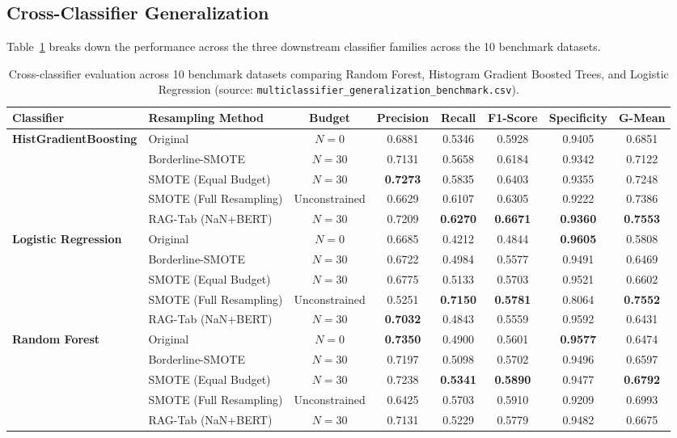 \documentclass[sn-basic]{sn-jnl}
\begin{document}
\subsection{Cross-Classifier Generalization}
\label{subsec:cross_classifier}

Table~\ref{tab:cross_classifier} breaks down the performance across the three downstream classifier families across the 10 benchmark datasets.

\begin{table}[t]
\centering
\caption{Cross-classifier evaluation across 10 benchmark datasets comparing Random Forest, Histogram Gradient Boosted Trees, and Logistic Regression (source: \texttt{multiclassifier\_generalization\_benchmark.csv}).}
\label{tab:cross_classifier}
\begin{tabular}{llcccccc}
\toprule
\textbf{Classifier} & \textbf{Resampling Method} & \textbf{Budget} & \textbf{Precision} & \textbf{Recall} & \textbf{F1-Score} & \textbf{Specificity} & \textbf{G-Mean} \\
\midrule
\multirow{5}{*}{\textbf{HistGradientBoosting}} & Original & $N=0$ & 0.6881 & 0.5346 & 0.5928 & 0.9405 & 0.6851 \\
& Borderline-SMOTE & $N=30$ & 0.7131 & 0.5658 & 0.6184 & 0.9342 & 0.7122 \\
& SMOTE (Equal Budget) & $N=30$ & \textbf{0.7273} & 0.5835 & 0.6403 & 0.9355 & 0.7248 \\
& SMOTE (Full Resampling) & Unconstrained & 0.6629 & 0.6107 & 0.6305 & 0.9222 & 0.7386 \\
& RAG-Tab (NaN+BERT) & $N=30$ & 0.7209 & \textbf{0.6270} & \textbf{0.6671} & \textbf{0.9360} & \textbf{0.7553} \\
\midrule
\multirow{5}{*}{\textbf{Logistic Regression}} & Original & $N=0$ & 0.6685 & 0.4212 & 0.4844 & \textbf{0.9605} & 0.5808 \\
& Borderline-SMOTE & $N=30$ & 0.6722 & 0.4984 & 0.5577 & 0.9491 & 0.6469 \\
& SMOTE (Equal Budget) & $N=30$ & 0.6775 & 0.5133 & 0.5703 & 0.9521 & 0.6602 \\
& SMOTE (Full Resampling) & Unconstrained & 0.5251 & \textbf{0.7150} & \textbf{0.5781} & 0.8064 & \textbf{0.7552} \\
& RAG-Tab (NaN+BERT) & $N=30$ & \textbf{0.7032} & 0.4843 & 0.5559 & 0.9592 & 0.6431 \\
\midrule
\multirow{5}{*}{\textbf{Random Forest}} & Original & $N=0$ & \textbf{0.7350} & 0.4900 & 0.5601 & \textbf{0.9577} & 0.6474 \\
& Borderline-SMOTE & $N=30$ & 0.7197 & 0.5098 & 0.5702 & 0.9496 & 0.6597 \\
& SMOTE (Equal Budget) & $N=30$ & 0.7238 & \textbf{0.5341} & \textbf{0.5890} & 0.9477 & \textbf{0.6792} \\
& SMOTE (Full Resampling) & Unconstrained & 0.6425 & 0.5703 & 0.5910 & 0.9209 & 0.6993 \\
& RAG-Tab (NaN+BERT) & $N=30$ & 0.7131 & 0.5229 & 0.5779 & 0.9482 & 0.6675 \\
\bottomrule
\end{tabular}
\end{table}
\end{document}
